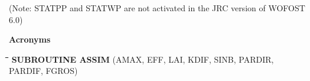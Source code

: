 \bigskip
(Note: STATPP and STATWP are not activated in the JRC version of WOFOST 6.0)

\bigskip
\bigskip
\bigskip
\bigskip
{\bf {\large Acronyms}}

\nwln
\begin{tabbing}
\hspace{1.27cm}\=\hspace{1.27cm}\=\hspace{1.27cm}\=\hspace{1.27cm}\=%
\hspace{1.27cm}\=\hspace{1.27cm}\=\hspace{1.27cm}\=\hspace{1.27cm}\=%
\hspace{1.27cm}\=\hspace{1.27cm}\=\kill
{\bf SUBROUTINE ASSIM}\> \> \> (AMAX, EFF, LAI, KDIF, SINB, PARDIR, PARDIF, FGROS)
\end{tabbing}
\nwln
